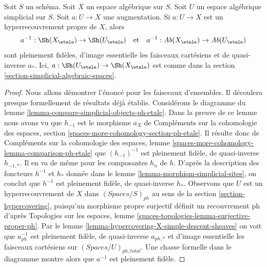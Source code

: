 \begin{lemma}
\label{lemma-descent-sheaves-for-ph-hypercovering}
Soit $S$ un schéma. Soit $X$ un espace algébrique sur $S$.
Soit $U$ un espace algébrique simplicial sur $S$. Soit $a : U \to X$
une augmentation. Si $a : U \to X$ est un hyperrecouvrement propre de $X$,
alors
$$
a^{-1} : \Sh(X_\etale) \to \Sh(U_\etale)
\quad\text{et}\quad
a^{-1} : \textit{Ab}(X_\etale) \to \textit{Ab}(U_\etale)
$$
sont pleinement fidèles, d'image essentielle les faisceaux cartésiens et
de quasi-inverse $a_*$. Ici, $a : \Sh(U_\etale) \to \Sh(X_\etale)$
est comme dans la section \ref{section-simplicial-algebraic-spaces}.
\end{lemma}

\begin{proof}
Nous allons démontrer l'énoncé pour les faisceaux d'ensembles. Il découlera
presque formellement de résultats déjà établis.
Considérons le diagramme du lemme
\ref{lemma-compare-simplicial-objects-ph-etale}.
Dans la preuve de ce lemme nous avons vu que
$h_{-1}$ est le morphisme $a_X$ de
Compléments sur la cohomologie des espaces, section
\ref{spaces-more-cohomology-section-ph-etale}.
Il résulte donc de
Compléments sur la cohomologie des espaces, lemme
\ref{spaces-more-cohomology-lemma-comparison-ph-etale}
que $(h_{-1})^{-1}$ est pleinement fidèle, de quasi-inverse $h_{-1, *}$.
Il en va de même pour les composantes $h_n$ de $h$.
D'après la description des foncteurs $h^{-1}$ et $h_*$ donnée dans le
lemme \ref{lemma-morphism-simplicial-sites},
on conclut que $h^{-1}$ est pleinement fidèle, de quasi-inverse $h_*$.
Observons que $U$ est un hyperrecouvrement de $X$ dans $(\textit{Spaces}/S)_{ph}$
au sens de la section \ref{section-hypercovering}, puisqu'un morphisme propre
surjectif définit un recouvrement ph d'après Topologies sur les espaces, lemme
\ref{spaces-topologies-lemma-surjective-proper-ph}.
Par le lemme \ref{lemma-hypercovering-X-simple-descent-sheaves}
on voit que $a_{ph}^{-1}$ est pleinement fidèle, de quasi-inverse
$a_{ph, *}$ et d'image essentielle les faisceaux cartésiens
sur $(\textit{Spaces}/U)_{ph, total}$.
Une chasse formelle dans le diagramme montre alors que
$a^{-1}$ est pleinement fidèle.


\end{proof}
